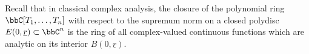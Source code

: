     \begin{remark}\label{rmk:closure_of_polynomials_with_respect_to_supremum_norm_is_Tate_algebra}
        Recall that in classical complex analysis, 
        the closure of the polynomial ring \(\bbC[T_1, \ldots, T_n]\) with respect to the supremum norm on a closed polydisc \(E(0,\underline{r}) \subset \bbC^n\) 
        is the ring of all complex-valued continuous functions which are analytic on its interior \(B(0,\underline{r})\). 
        
    \end{remark}

